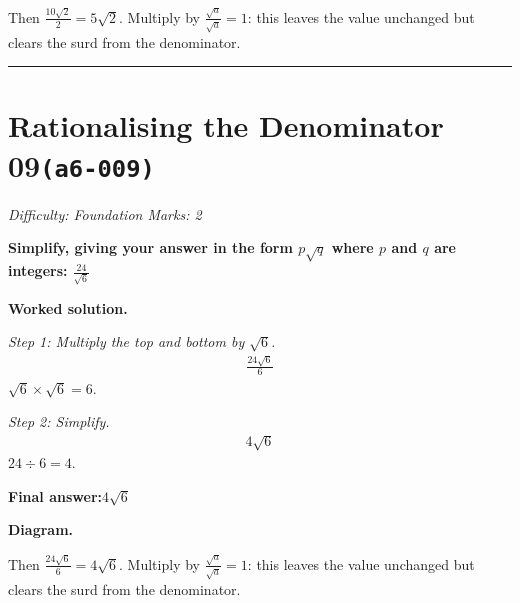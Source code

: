 \documentclass[11pt]{article}
\newcommand{\question}[1]{\par\medskip\noindent\textbf{#1}\par}
\begin{document}
\begin{center}
\end{center}
\small Then $\frac{10\sqrt2}{2}=5\sqrt2$. Multiply by $\frac{\sqrt{a}}{\sqrt{a}}=1$: this leaves the value unchanged but clears the surd from the denominator.\normalsize

\medskip\hrule

\section*{Rationalising the Denominator 09\quad\small\texttt{(a6-009)}}
\textit{Difficulty: Foundation \quad\textbar\quad Marks: 2}

\question{Simplify, giving your answer in the form \( p\sqrt{q} \) where \( p \) and \( q \) are integers: \( \frac{24}{\sqrt{6}} \)}

\textbf{Worked solution.}

\textit{Step 1: Multiply the top and bottom by \( \sqrt{6} \).}
\[\begin{gathered}
\frac{24\sqrt{6}}{6}
\end{gathered}\]
\( \sqrt{6} \times \sqrt{6} = 6 \).

\textit{Step 2: Simplify.}
\[\begin{gathered}
4\sqrt{6}
\end{gathered}\]
\( 24 \div 6 = 4 \).

\begin{answerbox}
\textbf{Final answer:}\quad \(\displaystyle 4\sqrt{6}\)
\end{answerbox}
\textbf{Diagram.}

\begin{center}
\end{center}
\small Then $\frac{24\sqrt6}{6}=4\sqrt6$. Multiply by $\frac{\sqrt{a}}{\sqrt{a}}=1$: this leaves the value unchanged but clears the surd from the denominator.\normalsize
\end{document}
